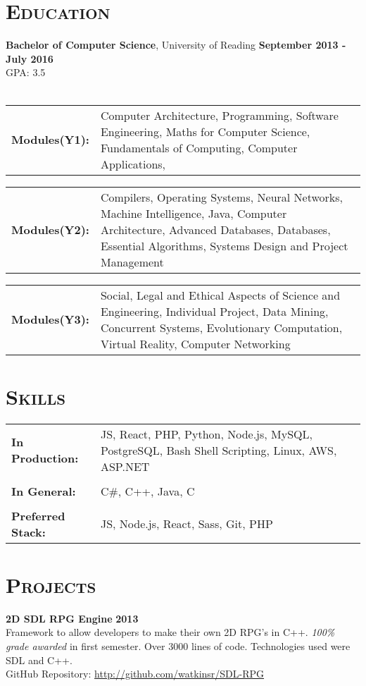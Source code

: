 \documentclass[line, margin, 10pt]{res}
\begin{document}
\begin{resume}
\section{\textsc{Education}}
{\bf Bachelor of Computer Science}, University of Reading {\bf \hfill September 2013 - July 2016}\\
GPA: 3.5 \\
\\
\begin{tabular}[t]{@{} p{1.2in} p{3.75in} @{}}
\bf{Modules(Y1):}  & Computer Architecture,
  Programming, 
  Software Engineering,
  Maths for Computer Science,
  Fundamentals of Computing,
  Computer Applications,
\end{tabular}

\begin{tabular}[t]{@{} p{1.2in} p{3.75in} @{}}  
\bf{Modules(Y2):}  & Compilers,
  Operating Systems,
  Neural Networks,
  Machine Intelligence,
  Java,
  Computer Architecture,
  Advanced Databases,
  Databases,
  Essential Algorithms,
  Systems Design and Project Management
\end{tabular}

\begin{tabular}[t]{@{} p{1.2in} p{3.75in} @{}}  
\bf{Modules(Y3):}  & Social, Legal and Ethical Aspects of Science and Engineering,
  Individual Project,
  Data Mining,
  Concurrent Systems,  
  Evolutionary Computation,
  Virtual Reality,
  Computer Networking
\end{tabular}

\section{\textsc{Skills}}
   \begin{tabular}[t]{@{} p{1.2in} p{3.75in} @{}}
     \bf{In Production:} & JS, React, PHP, Python, Node.js, MySQL, Post\nopagebreak[4]greSQL, Bash Shell Scripting, Linux, AWS, ASP.NET \\
    \\
    \bf{In General:} & C\#, C++, Java, C  \\
    \\
    \bf{Preferred Stack:} & JS, Node.js, React, Sass, Git, PHP \\
 \end{tabular}

\section{\textsc{Projects}}
{\bf 2D SDL RPG Engine} {\bf \hfill 2013}\\
Framework to allow developers to make their own 2D RPG's in C++. \textit{100\% grade awarded} in first semester. Over 3000 lines of code. Technologies used were SDL and C++.  \\
GitHub Repository: \url{http://github.com/watkinsr/SDL-RPG}


\end{resume}
\end{document}
